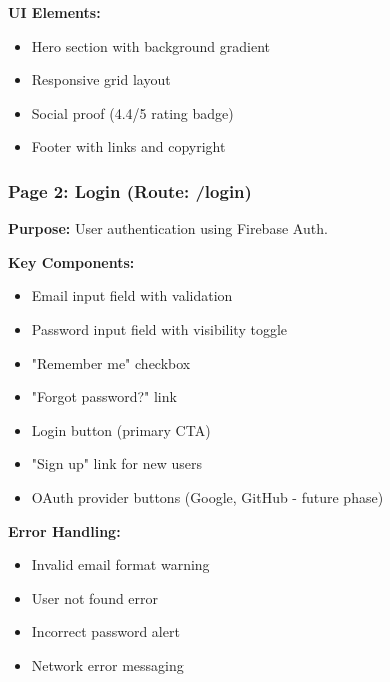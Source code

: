\documentclass[12pt,a4paper]{article}
\begin{document}
\textbf{UI Elements:}
\begin{itemize}[noitemsep, topsep=2pt]
  \item Hero section with background gradient
  \item Responsive grid layout
  \item Social proof (4.4/5 rating badge)
  \item Footer with links and copyright
\end{itemize}

\vspace{0.5cm}
\noindent{}
\vspace{1cm}


\subsubsection*{Page 2: Login (Route: /login)}

\textbf{Purpose:} User authentication using Firebase Auth.

\textbf{Key Components:}
\begin{itemize}[noitemsep, topsep=2pt]
  \item Email input field with validation
  \item Password input field with visibility toggle
  \item "Remember me" checkbox
  \item "Forgot password?" link
  \item Login button (primary CTA)
  \item "Sign up" link for new users
  \item OAuth provider buttons (Google, GitHub - future phase)
\end{itemize}

\textbf{Error Handling:}
\begin{itemize}[noitemsep, topsep=2pt]
  \item Invalid email format warning
  \item User not found error
  \item Incorrect password alert
  \item Network error messaging
\end{itemize}
\end{document}
